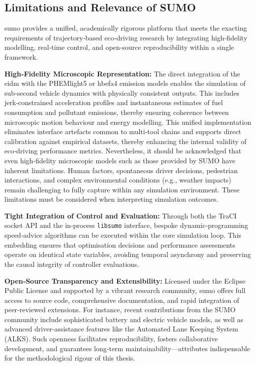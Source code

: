 \subsection{Limitations and Relevance of SUMO}
\label{subsec:sumo_limitation_relevance}

\ac{sumo} provides a unified, academically rigorous platform that meets the exacting requirements of trajectory‐based eco‐driving research by integrating high‐fidelity modelling, real‐time control, and open‐source reproducibility within a single framework.

\textbf{High‐Fidelity Microscopic Representation:}
The direct integration of the \ac{eidm} with the PHEMlight5 or \ac{hbefa}4 emission models enables the simulation of sub‐second vehicle dynamics with physically consistent outputs. This includes jerk‐constrained acceleration profiles and instantaneous estimates of fuel consumption and pollutant emissions, thereby ensuring coherence between microscopic motion behaviour and energy modelling. This unified implementation eliminates interface artefacts common to multi‐tool chains and supports direct calibration against empirical datasets, thereby enhancing the internal validity of eco‐driving performance metrics. Nevertheless, it should be acknowledged that even high‐fidelity microscopic models such as those provided by SUMO have inherent limitations. Human factors, spontaneous driver decisions, pedestrian interactions, and complex environmental conditions (e.g., weather impacts) remain challenging to fully capture within any simulation environment. These limitations must be considered when interpreting simulation outcomes.

\textbf{Tight Integration of Control and Evaluation:}
Through both the TraCI socket API and the in‐process \texttt{libsumo} interface, bespoke dynamic‐programming speed‐advice algorithms can be executed within the core simulation loop. This embedding ensures that optimisation decisions and performance assessments operate on identical state variables, avoiding temporal asynchrony and preserving the causal integrity of controller evaluations.

\textbf{Open‐Source Transparency and Extensibility:}
Licensed under the Eclipse Public License and supported by a vibrant research community, \ac{sumo} offers full access to source code, comprehensive documentation, and rapid integration of peer‐reviewed extensions. For instance, recent contributions from the SUMO community include sophisticated battery and electric vehicle models, as well as advanced driver-assistance features like the Automated Lane Keeping System (ALKS). Such openness facilitates reproducibility, fosters collaborative development, and guarantees long‐term maintainability—attributes indispensable for the methodological rigour of this thesis.


